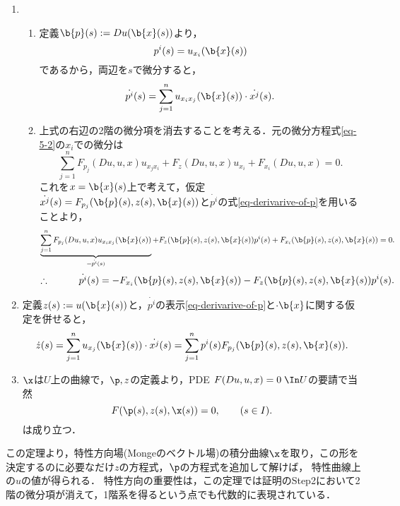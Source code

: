 \documentclass[uplatex,dvipdfmx]{jsreport}
\begin{document}
\begin{Proof}\mbox{}
    \begin{enumerate}
        \item \begin{enumerate}[{Step}1]
            \item 定義$\b{p}(s):=Du(\b{x}(s))$より，
            \begin{equation}\label{eq-derivarive-of-p}
                p^i(s)=u_{x_i}(\b{x}(s))
            \end{equation}
            であるから，両辺を$s$で微分すると，
            \[\dot{p^i}(s)=\sum_{j=1}^nu_{x_ix_j}(\b{x}(s))\cdot\dot{x^j}(s).\]
            \item 上式の右辺の2階の微分項を消去することを考える．元の微分方程式\ref{eq-5-2}の$x_i$での微分は
            \[\sum_{j=1}^nF_{p_j}(Du,u,x)u_{x_jx_i}+F_z(Du,u,x)u_{x_i}+F_{x_i}(Du,u,x)=0.\]
            これを$x=\b{x}(s)$上で考えて，仮定$\dot{x^j}(s)=F_{p_j}(\b{p}(s),z(s),\b{x}(s))$と$\dot{p^i}$の式\ref{eq-derivarive-of-p}を用いることより，
            \[\underbrace{\sum_{j=1}^nF_{p_j}(Du,u,x)u_{x_ix_j}(\b{x}(s))}_{=\dot{p^i}(s)}+F_z(\b{p}(s),z(s),\b{x}(s))p^i(s)+F_{x_i}(\b{p}(s),z(s),\b{x}(s))=0.\]
            \[\therefore\qquad\quad\dot{p^i}(s)=-F_{x_i}(\b{p}(s),z(s),\b{x}(s))-F_z(\b{p}(s),z(s),\b{x}(s))p^i(s).\]
        \end{enumerate}
        \item 定義$z(s):=u(\b{x}(s))$と，$\dot{p^i}$の表示\ref{eq-derivarive-of-p}と$\cdot{\b{x}}$に関する仮定を併せると，
        \[\dot{z}(s)=\sum_{j=1}^nu_{x_j}(\b{x}(s))\cdot\dot{x^j}(s)=\sum_{j=1}^np^i(s)F_{p_j}(\b{p}(s),z(s),\b{x}(s)).\]
        \item $\x$は$U$上の曲線で，$\p,z$の定義より，PDE $F(Du,u,x)=0\;\In U$の要請で当然
        \[F(\p(s),z(s),\x(s))=0,\qquad(s\in I).\]
        は成り立つ．
    \end{enumerate}
\end{Proof}
\begin{remarks}
    この定理より，特性方向場(Mongeのベクトル場)の積分曲線$\x$を取り，この形を決定するのに必要なだけ$z$の方程式，$\p$の方程式を追加して解けば，
    特性曲線上の$u$の値が得られる．
    特性方向の重要性は，この定理では証明のStep2において2階の微分項が消えて，1階系を得るという点でも代数的に表現されている．
\end{remarks}
\end{document}
